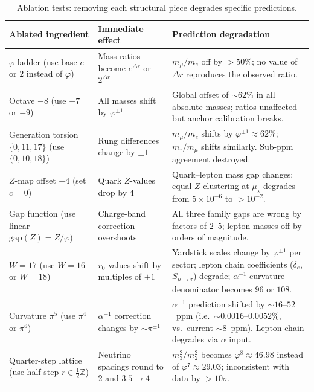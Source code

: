 \documentclass[11pt,a4paper]{article}
\theoremstyle{definition}
\theoremstyle{remark}
\newcommand{\phig}{\varphi}
\newcommand{\muStar}{\mu_{\star}}
\newcommand{\Zidx}{Z}
\begin{document}
\begin{table}[h]
\centering
\caption{Ablation tests: removing each structural piece degrades specific
predictions.}
\label{tab:ablation}
\small
\begin{tabular}{@{}p{3.5cm}p{4cm}p{4.5cm}@{}}
\toprule
Ablated ingredient & Immediate effect & Prediction degradation \\
\midrule
$\phig$-ladder (use base $e$ or $2$ instead of $\phig$) &
  Mass ratios become $e^{\Delta r}$ or $2^{\Delta r}$ &
  $m_\mu/m_e$ off by $> 50\%$; no value of $\Delta r$ reproduces
  the observed ratio. \\[4pt]
Octave $-8$ (use $-7$ or $-9$) &
  All masses shift by $\phig^{\pm 1}$ &
  Global offset of $\sim 62\%$ in all absolute masses; ratios unaffected
  but anchor calibration breaks. \\[4pt]
Generation torsion $\{0,11,17\}$ (use $\{0,10,18\}$) &
  Rung differences change by $\pm 1$ &
  $m_\mu/m_e$ shifts by $\phig^{\pm 1} \approx 62\%$; $m_\tau/m_\mu$
  shifts similarly.  Sub-ppm agreement destroyed. \\[4pt]
$\Zidx$-map offset $+4$ (set $c = 0$) &
  Quark $\Zidx$-values drop by 4 &
  Quark--lepton mass gap changes; equal-$\Zidx$ clustering at $\muStar$
  degrades from $5\times 10^{-6}$ to $> 10^{-2}$. \\[4pt]
Gap function (use linear $\mathrm{gap}(Z) = Z/\phig$) &
  Charge-band correction overshoots &
  All three family gaps are wrong by factors of $2$--$5$; lepton masses
  off by orders of magnitude. \\[4pt]
$W = 17$ (use $W = 16$ or $W = 18$) &
  $r_0$ values shift by multiples of $\pm 1$ &
  Yardstick scales change by $\phig^{\pm 1}$ per sector; lepton chain
  coefficients ($\delta_e$, $S_{\mu\to\tau}$) degrade; $\alpha^{-1}$
  curvature denominator becomes $96$ or $108$. \\[4pt]
Curvature $\pi^5$ (use $\pi^4$ or $\pi^6$) &
  $\alpha^{-1}$ correction changes by $\sim \pi^{\pm 1}$ &
  $\alpha^{-1}$ prediction shifted by $\sim 16$--$52$~ppm (i.e.\
  $\sim 0.0016$--$0.0052\%$, vs.\ current $\sim 8$~ppm).  Lepton chain
  degrades via $\alpha$ input. \\[4pt]
Quarter-step lattice (use half-step $r \in \frac{1}{2}\mathbb{Z}$) &
  Neutrino spacings round to $2$ and $3.5 \to 4$ &
  $m_3^2/m_2^2$ becomes $\phig^8 \approx 46.98$ instead of
  $\phig^7 \approx 29.03$; inconsistent with data by $> 10\sigma$. \\
\bottomrule
\end{tabular}
\end{table}
\end{document}
